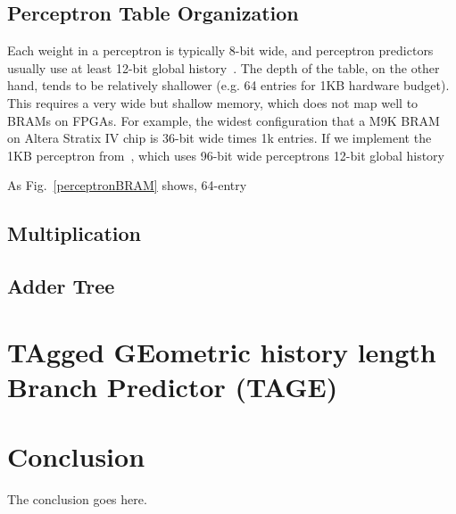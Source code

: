 \documentclass[conference]{IEEEtran}
\begin{document}
\subsection{Perceptron Table Organization}
\label{sec:advanced:perceptron:table}
Each weight in a perceptron is typically 8-bit wide, and perceptron predictors usually use at least 12-bit global history~\cite{perceptron}. The depth of the table, on the other hand, tends to be relatively shallower (e.g. 64 entries for 1KB hardware budget). This requires a very wide but shallow memory, which does not map well to BRAMs on FPGAs. For example, the widest configuration that a M9K BRAM on Altera Stratix IV chip is 36-bit wide times 1k entries. If we implement the 1KB perceptron from~\cite{perceptron}, which uses 96-bit wide perceptrons 12-bit global history

As Fig.~\ref{perceptronBRAM} shows,
64-entry




\subsection{Multiplication}
\label{sec:advanced:perceptron:mult}



\subsection{Adder Tree}
\label{sec:advanced:perceptron:adder}











\section{TAgged GEometric history length Branch Predictor (TAGE)}
\label{sec:advanced:tage}









\section{Conclusion}
The conclusion goes here.












\end{document}
